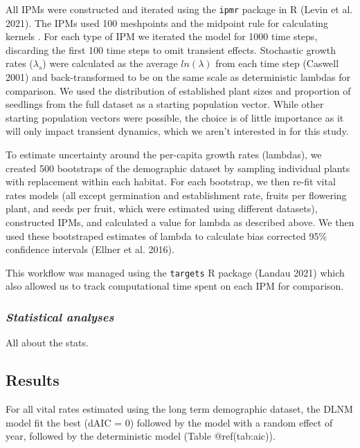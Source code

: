 \documentclass[
]{article}
\begin{document}
All IPMs were constructed and iterated using the \texttt{ipmr} package
in R (Levin et al. 2021). The IPMs used 100 meshpoints and the midpoint
rule for calculating kernels . For each type of IPM we iterated the
model for 1000 time steps, discarding the first 100 time steps to omit
transient effects. Stochastic growth rates (\(\lambda_s\)) were
calculated as the average \(ln(\lambda)\) from each time step (Caswell
2001) and back-transformed to be on the same scale as deterministic
lambdas for comparison. We used the distribution of established plant
sizes and proportion of seedlings from the full dataset as a starting
population vector. While other starting population vectors were
possible, the choice is of little importance as it will only impact
transient dynamics, which we aren't interested in for this study.

To estimate uncertainty around the per-capita growth rates (lambdas), we
created 500 bootstraps of the demographic dataset by sampling individual
plants with replacement within each habitat. For each bootstrap, we then
re-fit vital rates models (all except germination and establishment
rate, fruits per flowering plant, and seeds per fruit, which were
estimated using different datasets), constructed IPMs, and calculated a
value for lambda as described above. We then used these bootstraped
estimates of lambda to calculate bias corrected 95\% confidence
intervals (Ellner et al. 2016).

This workflow was managed using the \texttt{targets} R package (Landau
2021) which also allowed us to track computational time spent on each
IPM for comparison.

\hypertarget{statistical-analyses}{%
\subsubsection{\texorpdfstring{\emph{Statistical
analyses}}{Statistical analyses}}\label{statistical-analyses}}

All about the stats.

\hypertarget{results}{%
\subsection{Results}\label{results}}

For all vital rates estimated using the long term demographic dataset,
the DLNM model fit the best (dAIC = 0) followed by the model with a
random effect of year, followed by the deterministic model (Table
@ref(tab:aic)).\\
\end{document}
